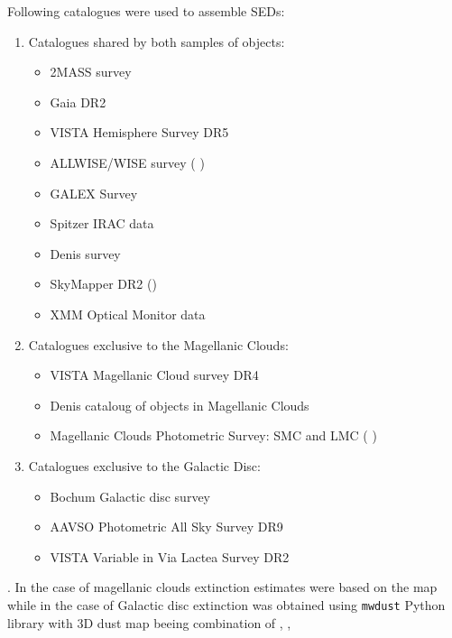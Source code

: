 \documentclass{pracalicmgr}
\begin{document}
Following catalogues were used to assemble SEDs:
\begin{enumerate}
\item Catalogues shared by both samples of objects:
\begin{itemize}
    \item 2MASS survey \citep{skrutskie_two_2006}
    \item Gaia DR2 \citep{gaia_collaboration_gaia_2018}
    \item VISTA Hemisphere Survey DR5 \citep{mcmahon_vizier_2021}
    \item ALLWISE/WISE survey (\citet*{wright_wide-field_2010} \citet*{cutri_vizier_2021})
    \item GALEX Survey \citep{bianchi_galex_2011}
    \item Spitzer IRAC data \citep{meixner_spitzer_2006}
    \item Denis survey  \citep{denis_vizier_2005}
    \item SkyMapper DR2 (\citet*{wolf_skymapper_2018}\citet*{onken_skymapper_2019})
    \item XMM Optical Monitor data \citep{page_xmm-newton_2012}
\end{itemize}
\item Catalogues exclusive to the Magellanic Clouds:
\begin{itemize}
    \item VISTA Magellanic Cloud survey DR4 \citep{cioni_vizier_2017}
    \item Denis cataloug of objects in Magellanic Clouds \citep{cioni_denis_2000}
    \item Magellanic Clouds Photometric Survey: SMC and LMC (\citet*{zaritsky_magellanic_2002} \citet*{zaritsky_magellanic_2004})
\end{itemize}
\item Catalogues exclusive to the Galactic Disc:
\begin{itemize}
    \item Bochum Galactic disc survey \citep{hackstein_bochum_2015}
    \item AAVSO Photometric All Sky Survey DR9 \citep{henden_apass_2015}
    \item VISTA Variable in Via Lactea Survey DR2 \citep{minniti_vizier_2017}
\end{itemize} 
\end{enumerate}. In the case of magellanic clouds extinction estimates were based on the map \citep{skowron_ogle-ing_2021} while in the case of Galactic disc extinction
was obtained using \texttt{mwdust} \citep{bovy_galactic_2016} Python library with 3D dust map beeing combination of \citep{green_3d_2019}, \citep{greiner_unusually_2001},
\end{document}
